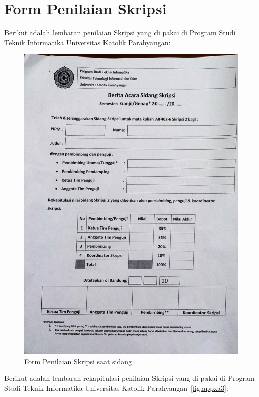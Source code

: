 \chapter{Form Penilaian Skripsi}
\label{app:A}

Berikut adalah lembaran penilaian Skripsi yang di pakai di Program Studi Teknik Informatika Universitas Katolik Parahyangan:

\begin{figure}[H]
\centering
\includegraphics[scale=0.20]{Gambar/dokumen_skripsi}
\caption[Form Penilaian Skripsi saat sidang]{Form Penilaian Skripsi saat sidang} 
\label{fig: skripsiAsli}
\end{figure}
\pagebreak
Berikut adalah lembaran rekapitulasi penilaian Skripsi yang di pakai di Program Studi Teknik Informatika Universitas Katolik Parahyangan~\ref{fig:appxa3}:

